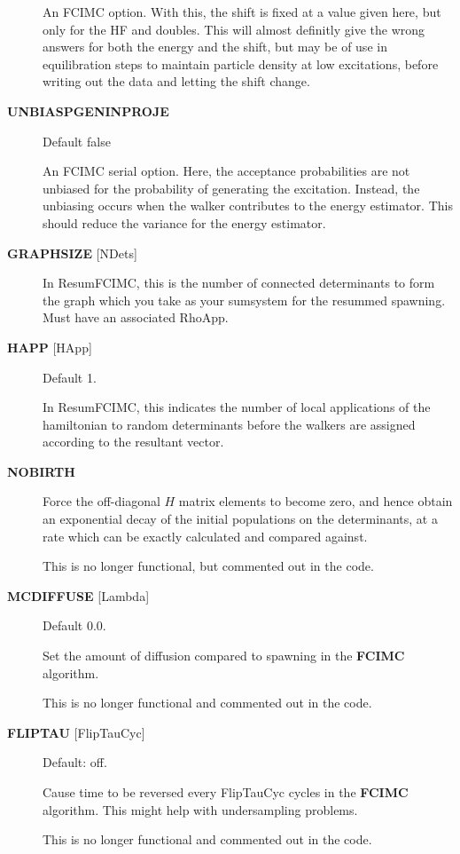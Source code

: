 \documentclass[openany,a4paper,10pt]{manual}
\begin{document}
\begin{description}
An FCIMC option. With this, the shift is fixed at a value given here,
but only for the HF and doubles. This will almost definitly give the wrong
answers for both the energy and the shift, but may be of use in equilibration
steps to maintain particle density at low excitations, before writing out the
data and letting the shift change.

\item[\textbf{UNBIASPGENINPROJE}]
Default false

An FCIMC serial option. Here, the acceptance probabilities are not unbiased for
the probability of generating the excitation. Instead, the unbiasing occurs when the
walker contributes to the energy estimator. This should reduce the variance for the
energy estimator.

\item[\textbf{GRAPHSIZE} {[}NDets{]}]
In ResumFCIMC, this is the number of connected determinants to form the
graph which you take as your sumsystem for the resummed spawning.  Must
have an associated RhoApp.

\item[\textbf{HAPP} {[}HApp{]}]
Default 1.

In ResumFCIMC, this indicates the number of local applications of the
hamiltonian to random determinants before the walkers are assigned
according to the resultant vector.

\item[\textbf{NOBIRTH}]
Force the off-diagonal $H$ matrix elements to become zero,
and hence obtain an exponential decay of the initial populations
on the determinants, at a rate which can be exactly calculated and
compared against.

This is no longer functional, but commented out in the
code.

\item[\textbf{MCDIFFUSE} {[}Lambda{]}]
Default 0.0.

Set the amount of diffusion compared to spawning in the \textbf{FCIMC}
algorithm.

This is no longer functional and commented out in the code.

\item[\textbf{FLIPTAU} {[}FlipTauCyc{]}]
Default: off.

Cause time to be reversed every FlipTauCyc cycles in the \textbf{FCIMC}
algorithm. This might help with undersampling problems.

This is no longer functional and commented out in the code.


\end{description}
\end{document}
